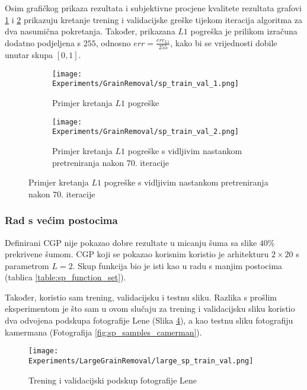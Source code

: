 Osim grafičkog prikaza rezultata i subjektivne procjene kvalitete rezultata grafovi \ref{fig:sp_train_val_graph_1} i \ref{fig:sp_train_val_graph_2} prikazuju kretanje trening i validacijske greške tijekom iteracija algoritma za dva nasumična pokretanja.
Također, prikazana $L1$ pogreška je prilikom izračuna dodatno podjeljena s $255$, odnosno $err = \frac{err_{L1}}{255}$, kako bi se vrijednosti dobile unutar skupa $[0, 1]$.

\begin{figure}
	\centering
	\caption{Grafovi kretanja $L1$ pogreške kroz iteracije algoritma}
	\begin{subfigure}[t]{0.48\textwidth}
		\texttt{[image: Experiments/GrainRemoval/sp\_train\_val\_1.png]}
		\caption{Primjer kretanja $L1$ pogreške}
		\label{fig:sp_train_val_graph_1}
	\end{subfigure}
	\begin{subfigure}[t]{0.48\textwidth}
		\texttt{[image: Experiments/GrainRemoval/sp\_train\_val\_2.png]}
		\caption{Primjer kretanja $L1$ pogreške s vidljivim nastankom pretreniranja nakon $70.$ iteracije}
		\label{fig:sp_train_val_graph_2}
	\end{subfigure}
	\label{fig:sp_train_val_graph}
\end{figure}

\subsubsection{Rad s većim postocima}
Definirani CGP nije pokazao dobre rezultate u micanju šuma sa slike $40\%$ prekrivene šumom.
CGP koji se pokazao korisnim koristio je arhitekturu $2 \times 20$ s parametrom $L = 2$.
Skup funkcija bio je isti kao u radu s manjim postocima (tablica \ref{table:sp_function_set}).

Također, koristio sam trening, validacijsku i testnu sliku.
Razlika s prošlim eksperimentom je što sam u ovom slučaju za trening i validacijsku sliku koristio dva odvojena podskupa fotografije Lene (Slika \ref{fig:large_sp_train_val_illustration}), a kao testnu sliku fotografiju kamermana (Fotografija \ref{fig:sp_samples_camerman}).

\begin{figure}
	\centering
	\texttt{[image: Experiments/LargeGrainRemoval/large\_sp\_train\_val.png]}
	\caption{Trening i validacijski podskup fotografije Lene}
	\label{fig:large_sp_train_val_illustration}
\end{figure}

